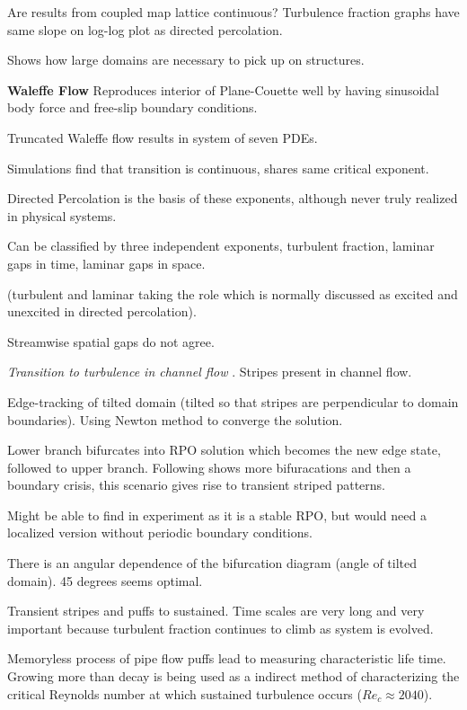 \begin{description}
{\begin{description}
Are results from coupled map lattice
continuous? Turbulence fraction
graphs have same slope on log-log
plot as directed percolation.

Shows how large domains are necessary
to pick up on structures.

\textbf{Waleffe Flow}
Reproduces interior of Plane-Couette
well by having sinusoidal body force
and free-slip boundary conditions.

Truncated Waleffe flow results in
system of seven PDEs.

Simulations find that transition is continuous, shares same critical
exponent.

Directed Percolation is the basis
of these exponents, although
never truly realized in physical
systems.

Can be classified by three independent
exponents, turbulent fraction, laminar
gaps in time, laminar gaps in space.

(turbulent and laminar taking the role
which is normally discussed as excited
and unexcited in directed percolation).

Streamwise spatial gaps do not agree.

\item[B. Hof Talk]
\textit{Transition to turbulence in channel flow}
.
Stripes present in channel flow.

Edge-tracking of tilted domain (tilted so that stripes are
perpendicular to domain boundaries). Using Newton method
to converge the solution.

Lower branch bifurcates into RPO solution which becomes the
new edge state, followed to upper branch.
Following shows more bifuracations and then a boundary crisis, this scenario
gives rise to transient striped patterns.

Might be able to find in experiment as it is a stable RPO,
but would need a localized version without periodic boundary conditions.

There is an angular dependence of the
bifurcation diagram (angle of tilted domain). 45 degrees seems optimal.

Transient stripes and puffs to sustained. Time scales are very long
and very important because turbulent
fraction continues to climb as system
is evolved.

Memoryless process of pipe flow puffs
lead to measuring characteristic life
time. Growing more than decay is being
used as a indirect method of characterizing the critical Reynolds
number at which sustained turbulence occurs ($Re_c \approx 2040$).


\end{description}}
\end{description}
